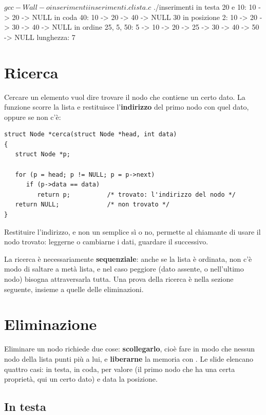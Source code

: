 \begin{console}
$ gcc -Wall -o inserimenti inserimenti.c lista.c
$ ./inserimenti
in testa 20 e 10:    10 -> 20 -> NULL
in coda 40:          10 -> 20 -> 40 -> NULL
30 in posizione 2:   10 -> 20 -> 30 -> 40 -> NULL
in ordine 25, 5, 50: 5 -> 10 -> 20 -> 25 -> 30 -> 40 -> 50 -> NULL
lunghezza: 7
\end{console}

\section{Ricerca}

Cercare un elemento vuol dire trovare il nodo che contiene un certo dato. La
funzione scorre la lista e restituisce l'\textbf{indirizzo} del primo nodo
con quel dato, oppure  se non c'è:

\begin{affianco}[0.55][c]
\begin{lstlisting}[style=c, name=lista.c]
struct Node *cerca(struct Node *head, int data)
{
   struct Node *p;

   for (p = head; p != NULL; p = p->next)
      if (p->data == data)
         return p;          /* trovato: l'indirizzo del nodo */
   return NULL;             /* non trovato */
}
\end{lstlisting}
\risultato
Restituire l'indirizzo, e non un semplice sì o no, permette al chiamante di
usare il nodo trovato: leggerne o cambiarne i dati, guardare il successivo.
\end{affianco}

La ricerca è necessariamente \textbf{sequenziale}: anche se la lista è
ordinata, non c'è modo di saltare a metà lista, e nel caso peggiore (dato
assente, o nell'ultimo nodo) bisogna attraversarla tutta. Una prova della
ricerca è nella sezione seguente, insieme a quelle delle eliminazioni.

\section{Eliminazione}

Eliminare un nodo richiede due cose: \textbf{scollegarlo}, cioè fare in modo
che nessun nodo della lista punti più a lui, e \textbf{liberarne} la memoria
con . Le slide elencano quattro casi: in testa, in coda, per
valore (il primo nodo che ha una certa proprietà, qui un certo dato) e data
la posizione.

\subsection{In testa}

